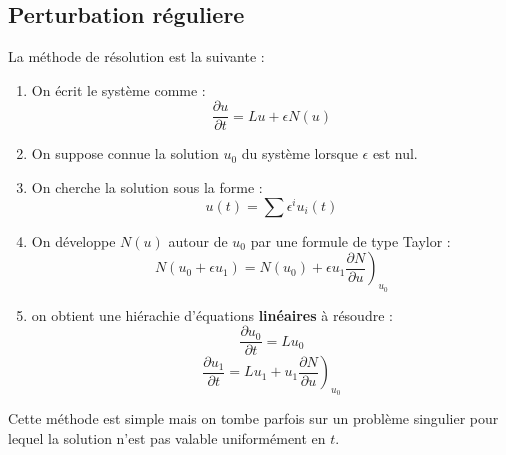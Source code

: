 \documentclass[12pt]{book}
\begin{document}
\subsection{Perturbation r\'eguliere}
La m\'ethode de r\'esolution est la suivante :
\begin{alg}
\begin{enumerate}
\item On \'ecrit le syst\`eme comme :
\begin{equation}
\frac{\partial u}{\partial t}=Lu+\epsilon N(u)
\end{equation}
\item On suppose connue la solution $u_0$ du syst\`eme lorsque $\epsilon$
est nul.
\item On cherche la solution sous la forme :
\begin{equation}
u(t)=\sum \epsilon^i u_i(t)
\end{equation}
\item On d\'eveloppe $N(u)$ autour de $u_0$ par une formule de type
Taylor :
\begin{equation}
N(u_0+\epsilon u_1)=N(u_0)+\epsilon u_1\left.\frac{\partial N}{\partial
    u}\right)_{u_0} 
\end{equation}
\item on obtient une hi\'erachie d'\'equations {\bf lin\'eaires} \`a
r\'esoudre :
\begin{equation}
\frac{\partial u_0}{\partial t}=Lu_0
\end{equation}
\begin{equation}
\frac{\partial u_1}{\partial t}=Lu_1+u_1\left.\frac{\partial N}{\partial
u}\right)_{u_0} 
\end{equation}
\end{enumerate}
\end{alg}
Cette m\'ethode est simple mais
on tombe parfois sur un probl\`eme singulier pour lequel la solution
n'est pas valable uniform\'ement en $t$.
\end{document}
